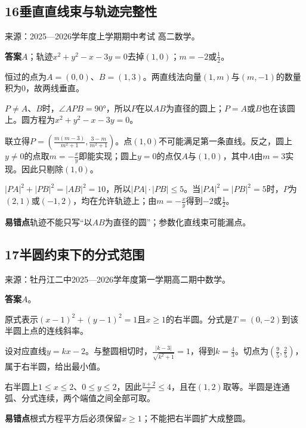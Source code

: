 \documentclass[UTF8,11pt,a4paper,fontset=windows]{ctexart}
\newcommand{\qhead}[2]{\subsection{#1\texorpdfstring{\quad}{ }#2}}
\newcommand{\qsource}[1]{{\footnotesize 来源：#1。\par}}
\begin{document}
\qhead{16}{垂直直线束与轨迹完整性}
\qsource{2025—2026学年度上学期期中考试 高二数学}
\textbf{答案}\quad \(A\)；轨迹\(x^{2}+ y^{2}- x- 3y= 0\)去掉\(\left(1,\allowbreak 0\right)\)；\(m= - 2\)或\(\frac{1}{2}\)。\par
恒过的点为\(A= \left(0,\allowbreak 0\right)\)、\(B= \left(1,\allowbreak 3\right)\)。两直线法向量\(\left(1,\allowbreak m\right)\)与\(\left(m,\allowbreak - 1\right)\)的数量积为\(0\)，故两线垂直。\par
\(P\ne A\)、\(B\)时，\(\angle APB= 90\)°，所以\(P\)在以\(AB\)为直径的圆上；\(P= A\)或\(B\)也在该圆上。圆方程为\(x^{2}+ y^{2}- x- 3y= 0\)。\par
联立得\(P= \left(\frac{m\left(m- 3\right)}{m^{2}+ 1},\allowbreak \frac{3- m}{m^{2}+ 1}\right)\)。点\(\left(1,\allowbreak 0\right)\)不可能满足第一条直线。反之，圆上\(y\ne 0\)的点取\(m= - \frac{x}{y}\)即能实现；圆上\(y= 0\)的点仅\(A\)与\(\left(1,\allowbreak 0\right)\)，其中\(A\)由\(m= 3\)实现。因此只剔除\(\left(1,\allowbreak 0\right)\)。\par
\(\lvert PA\rvert ^{2}+ \lvert PB\rvert ^{2}= \lvert AB\rvert ^{2}= 10\)，所以\(\lvert PA\rvert \cdot \lvert PB\rvert \le 5\)。当\(\lvert PA\rvert ^{2}= \lvert PB\rvert ^{2}= 5\)时，\(P\)为\(\left(2,\allowbreak 1\right)\)或\(\left(- 1,\allowbreak 2\right)\)，均在允许轨迹上；由\(m= - \frac{x}{y}\)得到\(- 2\)或\(\frac{1}{2}\)。\par
{\small\textbf{易错点}\quad 轨迹不能只写“以\(AB\)为直径的圆”；参数化直线束可能漏点。\par}

\qhead{17}{半圆约束下的分式范围}
\qsource{牡丹江二中2025—2026学年度第一学期高二期中数学}
\textbf{答案}\quad \(A\)。\par
原式表示\(\left(x- 1\right)^{2}+ \left(y- 1\right)^{2}= 1\)且\(x\ge 1\)的右半圆。分式是\(T= \left(0,\allowbreak - 2\right)\)到该半圆上点的连线斜率。\par
设对应直线\(y= kx- 2\)。与整圆相切时，\(\frac{\lvert k- 3\rvert }{\sqrt{k^{2}+ 1}}= 1\)，得到\(k= \frac{4}{3}\)。切点为\(\left(\frac{9}{5},\allowbreak \frac{2}{5}\right)\)，属于右半圆，给出最小值。\par
右半圆上\(1\le x\le 2\)、\(0\le y\le 2\)，因此\(\frac{y+ 2}{x}\le 4\)，且在\(\left(1,\allowbreak 2\right)\)取等。半圆是连通弧、分式连续，两个端值之间全部可取。\par
{\small\textbf{易错点}\quad 根式方程平方后必须保留\(x\ge 1\)；不能把右半圆扩大成整圆。\par}

\clearpage
\end{document}
